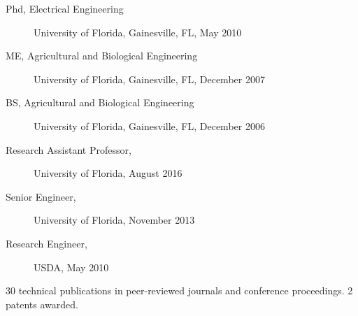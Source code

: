 


\begin{description}
\item[Phd, Electrical Engineering] University of Florida, Gainesville, FL, May 2010
\item[ME, Agricultural and Biological Engineering] University of Florida, Gainesville, FL, December 2007
\item[BS, Agricultural and Biological Engineering] University of Florida, Gainesville, FL, December 2006
\end{description}

\begin{description}
\item[Research Assistant Professor,] University of Florida, August 2016
\item[Senior Engineer,] University of Florida, November 2013
\item[Research Engineer,] USDA,	May 2010
\end{description}

30 technical publications in peer-reviewed journals and conference proceedings. 2 patents awarded.


